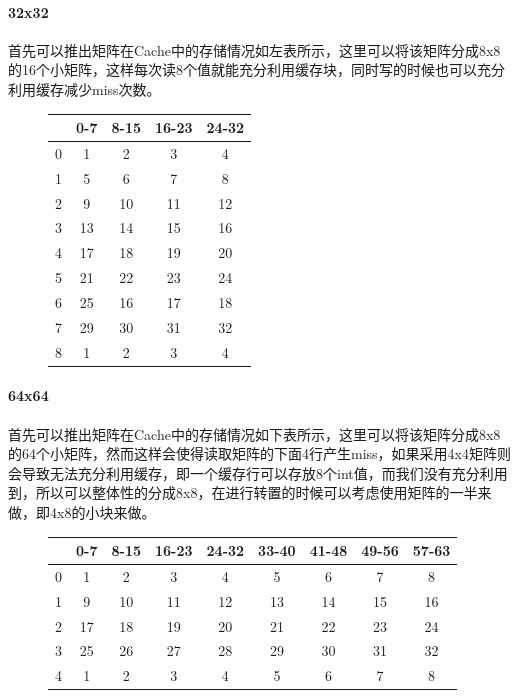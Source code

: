 \paragraph{32x32}首先可以推出矩阵在Cache中的存储情况如左表所示，这里可以将该矩阵分成8x8的16个小矩阵，这样每次读8个值就能充分利用缓存块，同时写的时候也可以充分利用缓存减少miss次数。

\begin{figure}[H]
    \begin{minipage}[c]{0.4\linewidth}
        \begin{tabular}{|c|c|c|c|c|}
            \hline 
            & 0-7 & 8-15 & 16-23 & 24-32 \\ 
            \hline 
            0 & 1 & 2 & 3 & 4 \\ 
            \hline 
            1 & 5 & 6 & 7 & 8 \\ 
            \hline 
            2 & 9 & 10 & 11 & 12 \\ 
            \hline 
            3 & 13 & 14 & 15 & 16 \\ 
            \hline 
            4 & 17 & 18 & 19 & 20 \\ 
            \hline 
            5 & 21 & 22 & 23 & 24 \\ 
            \hline 
            6 & 25 & 16 & 17 & 18 \\ 
            \hline 
            7 & 29 & 30 & 31 & 32 \\ 
            \hline 
            8 & 1 & 2 & 3 & 4 \\ 
            \hline 
        \end{tabular} 
    \end{minipage}
\end{figure}

\paragraph{64x64}首先可以推出矩阵在Cache中的存储情况如下表所示，这里可以将该矩阵分成8x8的64个小矩阵，然而这样会使得读取矩阵的下面4行产生miss，如果采用4x4矩阵则会导致无法充分利用缓存，即一个缓存行可以存放8个int值，而我们没有充分利用到，所以可以整体性的分成8x8，在进行转置的时候可以考虑使用矩阵的一半来做，即4x8的小块来做。

\begin{figure}[H]
\begin{tabular}{|c|c|c|c|c|c|c|c|c|}
\hline 
& 0-7 & 8-15 & 16-23 & 24-32 & 33-40 & 41-48 & 49-56 & 57-63\\ 
\hline 
0 & 1 & 2 & 3 & 4 & 5 & 6 & 7 & 8\\
\hline 
1 & 9 & 10 & 11 & 12 & 13 & 14 & 15 & 16 \\ 
\hline 
2 & 17 & 18 & 19 & 20 & 21 & 22 & 23 & 24 \\ 
\hline 
3 & 25 & 26 & 27 & 28 & 29 & 30 & 31 & 32 \\ 
\hline 
4 & 1 & 2 & 3 & 4 & 5 & 6 & 7 & 8\\
\hline 
\end{tabular} 
\end{figure}

